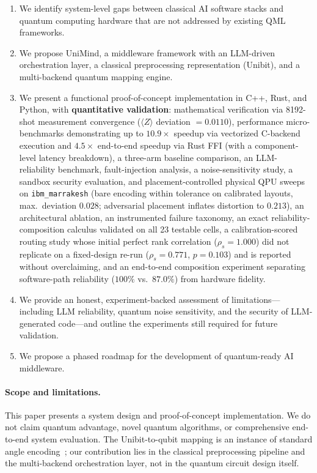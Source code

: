 ﻿\documentclass[12pt,a4paper]{article}
\begin{document}
\begin{enumerate}[leftmargin=2em]
    \item We identify system-level gaps between classical AI software stacks and quantum computing hardware that are not addressed by existing QML frameworks.
    \item We propose UniMind, a middleware framework with an LLM-driven orchestration layer, a classical preprocessing representation (Unibit), and a multi-backend quantum mapping engine.
    \item We present a functional proof-of-concept implementation in C++, Rust, and Python, with \textbf{quantitative validation}: mathematical verification via 8192-shot measurement convergence ($\langle Z \rangle$ deviation $= 0.0110$), performance micro-benchmarks demonstrating up to $10.9\times$ speedup via vectorized C-backend execution and $4.5\times$ end-to-end speedup via Rust FFI (with a component-level latency breakdown), a three-arm baseline comparison, an LLM-reliability benchmark, fault-injection analysis, a noise-sensitivity study, a sandbox security evaluation, and placement-controlled physical QPU sweeps on \texttt{ibm\_marrakesh} (bare encoding within tolerance on calibrated layouts, max.\ deviation $0.028$; adversarial placement inflates distortion to $0.213$), an architectural ablation, an instrumented failure taxonomy, an exact reliability-composition calculus validated on all 23 testable cells, a calibration-scored routing study whose initial perfect rank correlation ($\rho_s = 1.000$) did not replicate on a fixed-design re-run ($\rho_s = 0.771$, $p = 0.103$) and is reported without overclaiming, and an end-to-end composition experiment separating software-path reliability ($100\%$ vs.\ $87.0\%$) from hardware fidelity.
    \item We provide an honest, experiment-backed assessment of limitations---including LLM reliability, quantum noise sensitivity, and the security of LLM-generated code---and outline the experiments still required for future validation.
    \item We propose a phased roadmap for the development of quantum-ready AI middleware.
\end{enumerate}

\paragraph{Scope and limitations.} This paper presents a system design and proof-of-concept implementation. We do not claim quantum advantage, novel quantum algorithms, or comprehensive end-to-end system evaluation. The Unibit-to-qubit mapping is an instance of standard angle encoding~\cite{schuld2021}; our contribution lies in the classical preprocessing pipeline and the multi-backend orchestration layer, not in the quantum circuit design itself.
\end{document}

